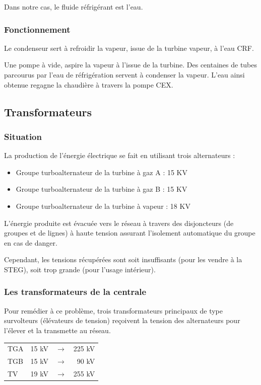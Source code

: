 Dans notre cas, le fluide réfrigérant est  l'eau. 


\subsubsection{Fonctionnement}
Le condenseur sert à refroidir la vapeur, issue de la turbine vapeur, à l'eau CRF.

Une pompe  à vide, aspire la vapeur à l'issue de la turbine.
Des centaines de tubes parcourus par l'eau de réfrigération servent à condenser la vapeur.
L'eau ainsi obtenue regagne la chaudière à travers la pompe CEX.
 
\subsection{Transformateurs}
\subsubsection{Situation}
La production de l'énergie électrique se fait en utilisant trois alternateurs :

\begin{itemize}
\item Groupe turboalternateur de la turbine à gaz A  : 15 KV
\item Groupe turboalternateur de la turbine à gaz B  : 15 KV
\item Groupe turboalternateur de la turbine à vapeur : 18 KV
\end{itemize}

   L'énergie  produite  est  évacuée  vers  le  réseau  à  travers  des  disjoncteurs (de groupes et de lignes)  à  haute tension assurant l'isolement automatique du groupe en cas de danger.
  

Cependant, les tensions récupérées sont soit insuffisants (pour les vendre à la STEG), soit trop grande (pour l'usage intérieur).

\subsubsection{Les transformateurs de la centrale}

Pour remédier à ce problème, trois transformateurs principaux de type survolteurs (élévateurs de tension) reçoivent la tension des alternateurs pour l'élever et la transmette au réseau.

\begin{center}
\begin{tabular}{ l l c r}
TGA &15 kV & $\longrightarrow $& 225 kV\\
TGB &15 kV &$\longrightarrow $& 90 kV\\
TV &19 kV &$\longrightarrow $& 255 kV \\
\end{tabular}
\end{center}

